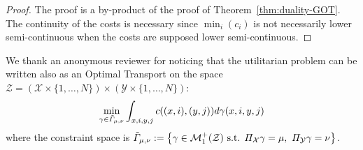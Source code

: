 \begin{proof}
The proof is a by-product of the proof of Theorem~\ref{thm:duality-GOT}. The continuity of the costs is necessary since $\min_i(c_i)$ is not necessarily lower semi-continuous when the costs are supposed lower semi-continuous.
\end{proof}

\begin{rmq} 
We thank an anonymous reviewer for noticing that the utilitarian problem can be written also as an Optimal Transport on the space  $\mathcal{Z} = (\mathcal{X}\times\{1,\dots,N\})\times(\mathcal{Y}\times\{1,\dots,N\})$:
\begin{align*}
    \min_{\gamma\in\Tilde{\Gamma}_{\mu,\nu}}\int_{x,i,y,j} c((x,i),(y,j))d\gamma(x,i,y,j) 
\end{align*}
where the constraint space is  $\Tilde{\Gamma}_{\mu,\nu}:=\left\{\gamma\in\mathcal{M}_1^+(\mathcal{Z})\text{ s.t. }\Pi_{\mathcal{X}}\gamma = \mu,~\Pi_{\mathcal{Y}}\gamma = \nu\right\}$.
\end{rmq}



